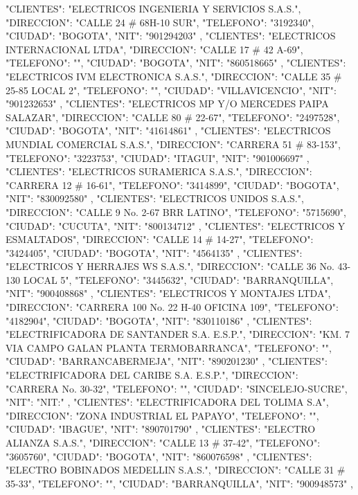    {
   "CLIENTES": "ELECTRICOS INGENIERIA Y SERVICIOS S.A.S.",
   "DIRECCION": "CALLE 24 # 68H-10 SUR",
   "TELEFONO": "3192340",
   "CIUDAD": "BOGOTA",
   "NIT": "901294203"
   },
   {
   "CLIENTES": "ELECTRICOS INTERNACIONAL LTDA",
   "DIRECCION": "CALLE 17 # 42 A-69",
   "TELEFONO": "",
   "CIUDAD": "BOGOTA",
   "NIT": "860518665"
   },
   {
   "CLIENTES": "ELECTRICOS IVM ELECTRONICA S.A.S.",
   "DIRECCION": "CALLE 35 # 25-85 LOCAL 2",
   "TELEFONO": "",
   "CIUDAD": "VILLAVICENCIO",
   "NIT": "901232653"
   },
   {
   "CLIENTES": "ELECTRICOS MP Y/O MERCEDES PAIPA SALAZAR",
   "DIRECCION": "CALLE 80 # 22-67",
   "TELEFONO": "2497528",
   "CIUDAD": "BOGOTA",
   "NIT": "41614861"
   },
   {
   "CLIENTES": "ELECTRICOS MUNDIAL COMERCIAL S.A.S.",
   "DIRECCION": "CARRERA 51 # 83-153",
   "TELEFONO": "3223753",
   "CIUDAD": "ITAGUI",
   "NIT": "901006697"
   },
   {
   "CLIENTES": "ELECTRICOS SURAMERICA S.A.S.",
   "DIRECCION": "CARRERA 12 # 16-61",
   "TELEFONO": "3414899",
   "CIUDAD": "BOGOTA",
   "NIT": "830092580"
   },
   {
   "CLIENTES": "ELECTRICOS UNIDOS S.A.S.",
   "DIRECCION": "CALLE 9 No. 2-67 BRR LATINO",
   "TELEFONO": "5715690",
   "CIUDAD": "CUCUTA",
   "NIT": "800134712"
   },
   {
   "CLIENTES": "ELECTRICOS Y ESMALTADOS",
   "DIRECCION": "CALLE 14 # 14-27",
   "TELEFONO": "3424405",
   "CIUDAD": "BOGOTA",
   "NIT": "4564135"
   },
   {
   "CLIENTES": "ELECTRICOS Y HERRAJES WS S.A.S.",
   "DIRECCION": "CALLE 36 No. 43-130 LOCAL 5",
   "TELEFONO": "3445632",
   "CIUDAD": "BARRANQUILLA",
   "NIT": "900408868"
   },
   {
   "CLIENTES": "ELECTRICOS Y MONTAJES LTDA",
   "DIRECCION": "CARRERA 100 No. 22 H-40 OFICINA 109",
   "TELEFONO": "4182904",
   "CIUDAD": "BOGOTA",
   "NIT": "830110186"
   },
   {
   "CLIENTES": "ELECTRIFICADORA DE SANTANDER S.A. E.S.P.",
   "DIRECCION": "KM. 7 VIA CAMPO GALAN PLANTA TERMOBARRANCA",
   "TELEFONO": "",
   "CIUDAD": "BARRANCABERMEJA",
   "NIT": "890201230"
   },
   {
   "CLIENTES": "ELECTRIFICADORA DEL CARIBE S.A. E.S.P.",
   "DIRECCION": "CARRERA No. 30-32",
   "TELEFONO": "",
   "CIUDAD": "SINCELEJO-SUCRE",
   "NIT": "NIT:"
   },
   {
   "CLIENTES": "ELECTRIFICADORA DEL TOLIMA S.A",
   "DIRECCION": "ZONA INDUSTRIAL EL PAPAYO",
   "TELEFONO": "",
   "CIUDAD": "IBAGUE",
   "NIT": "890701790"
   },
   {
   "CLIENTES": "ELECTRO ALIANZA S.A.S.",
   "DIRECCION": "CALLE 13 # 37-42",
   "TELEFONO": "3605760",
   "CIUDAD": "BOGOTA",
   "NIT": "860076598"
   },
   {
   "CLIENTES": "ELECTRO BOBINADOS MEDELLIN S.A.S.",
   "DIRECCION": "CALLE 31 # 35-33",
   "TELEFONO": "",
   "CIUDAD": "BARRANQUILLA",
   "NIT": "900948573"
   },
